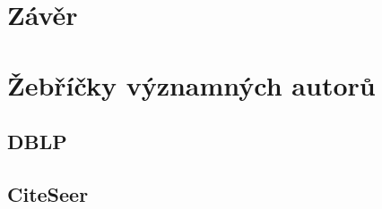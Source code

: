 \documentclass{bakalarka}
\begin{document}
\chapter{Závěr}

\appendix




\newpage
\appendix
\chapter{Žebříčky významných autorů}
\label{chapter:zebricky}

\newpage
\section{DBLP}
\label{section:zebrickydblp}

















\section{CiteSeer}
\label{section:zebrickyciteseer}
\end{document}
